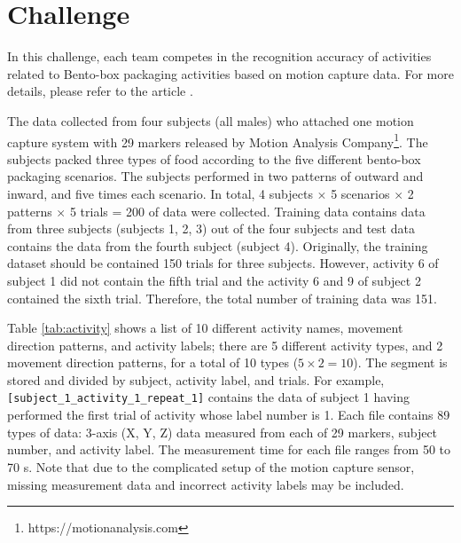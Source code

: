 \documentclass[graybox]{svmult}
\begin{document}
\section{Challenge}
\label{sec:challenge}
In this challenge, each team competes in the recognition accuracy of activities related to Bento-box packaging activities based on motion capture data. For more details, please refer to the article \cite{ex1}.\par

The data collected from four subjects (all males) who attached one motion capture system with 29 markers released by Motion Analysis Company\footnote{https://motionanalysis.com}. The subjects packed three types of food according to the five different bento-box packaging scenarios. The subjects performed in two patterns of outward and inward, and five times each scenario. In total, 4 subjects $\times$ 5 scenarios $\times$ 2 patterns $\times$ 5 trials = 200 of data were collected. Training data contains data from three subjects (subjects 1, 2, 3) out of the four subjects and test data contains the data from the fourth subject (subject 4). Originally, the training dataset should be contained 150 trials for three subjects. However, activity 6 of subject 1 did not contain the fifth trial and the activity 6 and 9 of subject 2 contained the sixth trial. Therefore, the total number of training data was 151.\par

Table \ref{tab:activity} shows a list of 10 different activity names, movement direction patterns, and activity labels; there are 5 different activity types, and 2 movement direction patterns, for a total of 10 types ($5 \times 2 = 10$). The segment is stored and divided by subject, activity label, and trials. For example, {\tt [subject\verb|_|1\verb|_|activity\verb|_|1\verb|_|repeat\verb|_|1]} contains the data of subject 1 having performed the first trial of activity whose label number is 1. Each file contains 89 types of data: 3-axis (X, Y, Z) data measured from each of 29 markers, subject number, and activity label. The measurement time for each file ranges from 50 to 70 s. Note that due to the complicated setup of the motion capture sensor, missing measurement data and incorrect activity labels may be included.\par
\end{document}
